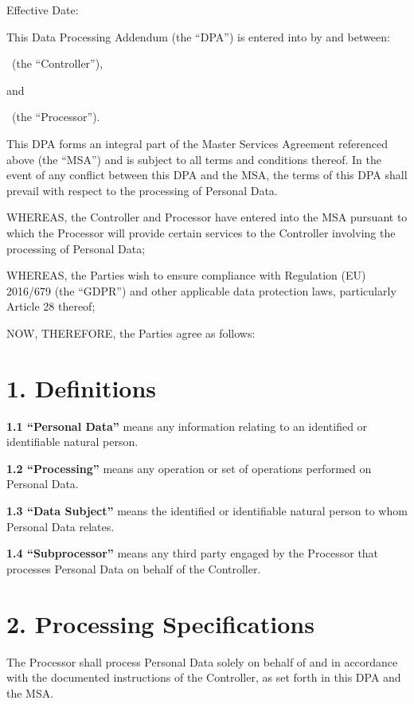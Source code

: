 \documentclass[11pt]{article}
\begin{document}

\begin{center}
Effective Date: \EffectiveDate
\end{center}

This Data Processing Addendum (the ``DPA'') is entered into by and between:

\textbf{\ClientName}\ (the ``Controller''),

and

\textbf{\VendorName}\ (the ``Processor'').

This DPA forms an integral part of the Master Services Agreement referenced above (the
``MSA'') and is subject to all terms and conditions thereof. In the event of any conflict
between this DPA and the MSA, the terms of this DPA shall prevail with respect to the
processing of Personal Data.

WHEREAS, the Controller and Processor have entered into the MSA pursuant to which the
Processor will provide certain services to the Controller involving the processing of
Personal Data;

WHEREAS, the Parties wish to ensure compliance with Regulation (EU) 2016/679 (the ``GDPR'')
and other applicable data protection laws, particularly Article 28 thereof;

NOW, THEREFORE, the Parties agree as follows:

\section*{1. Definitions}
\textbf{1.1 ``Personal Data''} means any information relating to an identified or
identifiable natural person.

\textbf{1.2 ``Processing''} means any operation or set of operations performed on Personal
Data.

\textbf{1.3 ``Data Subject''} means the identified or identifiable natural person to whom
Personal Data relates.

\textbf{1.4 ``Subprocessor''} means any third party engaged by the Processor that processes
Personal Data on behalf of the Controller.

\section*{2. Processing Specifications}
The Processor shall process Personal Data solely on behalf of and in accordance with the
documented instructions of the Controller, as set forth in this DPA and the MSA.
\end{document}

